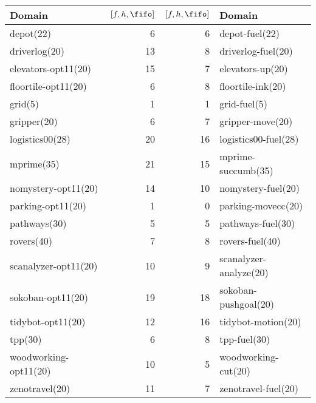 \begin{center}
\begin{tabular}{lrrl}
\hline
Domain & $[f,h,\fifo]$ & $[f,h,\fifo]$ & Domain\\
\hline
depot(22) & 6 & 6 & depot-fuel(22)\\
driverlog(20) & 13 & 8 & driverlog-fuel(20)\\
elevators-opt11(20) & 15 & 7 & elevators-up(20)\\
floortile-opt11(20) & 6 & 8 & floortile-ink(20)\\
grid(5) & 1 & 1 & grid-fuel(5)\\
gripper(20) & 6 & 7 & gripper-move(20)\\
logistics00(28) & 20 & 16 & logistics00-fuel(28)\\
mprime(35) & 21 & 15 & mprime-succumb(35)\\
nomystery-opt11(20) & 14 & 10 & nomystery-fuel(20)\\
parking-opt11(20) & 1 & 0 & parking-movecc(20)\\
pathways(30) & 5 & 5 & pathways-fuel(30)\\
rovers(40) & 7 & 8 & rovers-fuel(40)\\
scanalyzer-opt11(20) & 10 & 9 & scanalyzer-analyze(20)\\
sokoban-opt11(20) & 19 & 18 & sokoban-pushgoal(20)\\
tidybot-opt11(20) & 12 & 16 & tidybot-motion(20)\\
tpp(30) & 6 & 8 & tpp-fuel(30)\\
woodworking-opt11(20) & 10 & 5 & woodworking-cut(20)\\
zenotravel(20) & 11 & 7 & zenotravel-fuel(20)\\
\hline
\end{tabular}
\end{center}
